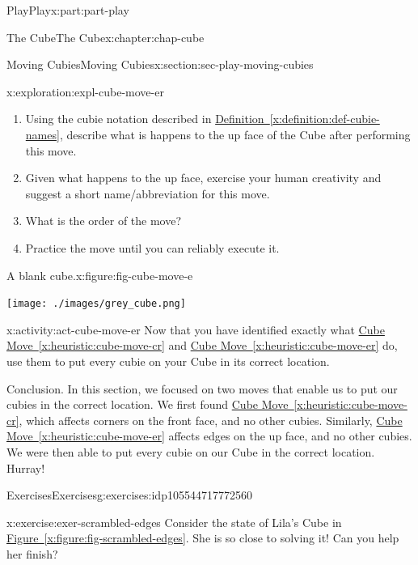 \documentclass[oneside,10pt,]{book}
\newcommand{\xreffont}{\relax}
\numberwithin{equation}{section}
\begin{document}
\begin{partptx}{Play}{}{Play}{}{}{x:part:part-play}
\begin{chapterptx}{The Cube}{}{The Cube}{}{}{x:chapter:chap-cube}
\begin{sectionptx}{Moving Cubies}{}{Moving Cubies}{}{}{x:section:sec-play-moving-cubies}
\begin{exploration}{}{x:exploration:expl-cube-move-er}
\begin{enumerate}
\item{}Using the cubie notation described in \hyperref[x:definition:def-cubie-names]{Definition~{\xreffont\ref{x:definition:def-cubie-names}}}, describe what is happens to the up face of the Cube after performing this move.%
\item{}Given what happens to the up face, exercise your human creativity and suggest a short name\slash{}abbreviation for this move.%
\item{}What is the order of the move?%
\item{}Practice the move until you can reliably execute it.%
\end{enumerate}
\begin{figureptx}{A blank cube.}{x:figure:fig-cube-move-e}{}%
\begin{image}{0.25}{0.5}{0.25}%
\texttt{[image: ./images/grey\_cube.png]}
\end{image}%
\tcblower
\end{figureptx}%
\end{exploration}%
\begin{activity}{}{x:activity:act-cube-move-er}%
Now that you have identified exactly what \hyperref[x:heuristic:cube-move-cr]{Cube Move~{\xreffont\ref{x:heuristic:cube-move-cr}}} and \hyperref[x:heuristic:cube-move-er]{Cube Move~{\xreffont\ref{x:heuristic:cube-move-er}}} do, use them to put every cubie on your Cube in its correct location.%
\end{activity}%
\begin{conclusion}{Conclusion.}%
In this section, we focused on two moves that enable us to put our cubies in the correct location. We first found \hyperref[x:heuristic:cube-move-cr]{Cube Move~{\xreffont\ref{x:heuristic:cube-move-cr}}}, which affects corners on the front face, and no other cubies. Similarly, \hyperref[x:heuristic:cube-move-er]{Cube Move~{\xreffont\ref{x:heuristic:cube-move-er}}} affects edges on the up face, and no other cubies. We were then able to put every cubie on our Cube in the correct location. Hurray!%
\end{conclusion}%
%
%
\typeout{************************************************}
\typeout{************************************************}
%
\begin{exercises-subsection-numberless}{Exercises}{}{Exercises}{}{}{g:exercises:idp105544717772560}
\begin{divisionexercise}{1}{}{}{x:exercise:exer-scrambled-edges}%
Consider the state of Lila's Cube in \hyperref[x:figure:fig-scrambled-edges]{Figure~{\xreffont\ref{x:figure:fig-scrambled-edges}}}. She is so close to solving it! Can you help her finish?%

\end{divisionexercise}
\end{exercises-subsection-numberless}
\end{sectionptx}
\end{chapterptx}
\end{partptx}
\end{document}
